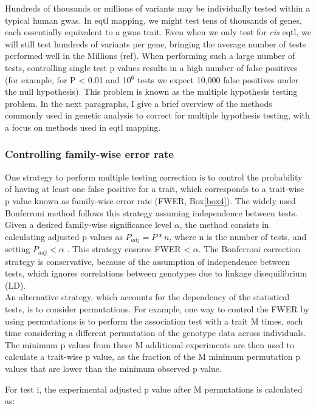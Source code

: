 Hundreds of thousands or millions of variants may be individually tested within a typical human \gls{gwas}. 
In e\gls{qtl} mapping, we might test tens of thousands of genes, each essentially equivalent to a \gls{gwas} trait. 
Even when we only test for \textit{cis} e\gls{qtl}, we will still test hundreds of variants per gene, bringing the average number of tests performed well in the Millions (ref).  
When performing such a large number of tests, controlling single test p values results in a high number of false positives (for example, for P < 0.01 and 10$^6$ tests we expect 10,000 false positives under the null hypothesis). 
This problem is known as the multiple hypothesis testing problem. 
In the next paragraphs, I give a brief overview of the methods commonly used in genetic analysis to correct for multiple hypothesis testing, with a focus on methods used in e\gls{qtl} mapping.

\subsubsection{Controlling family-wise error rate} 

One strategy to perform multiple testing correction is to control the probability of having at least one false positive for a trait, which corresponds to a trait-wise p value known as family-wise error rate (FWER, Box\ref{box4}).
The widely used Bonferroni method follows this strategy assuming independence between tests. 
Given a desired family-wise significance level $\alpha$, the method consists in calculating adjusted p values as $P_{adj} = P*n $, where n is the number of tests, and setting $P_{adj} < \alpha$ . 
This strategy ensures FWER < $\alpha$. 
The Bonferroni correction strategy is conservative, because of the assumption of independence between tests, which ignores correlations between genotypes due to linkage disequilibrium (LD).\\

An alternative strategy, which accounts for the dependency of the statistical tests, is to consider permutations. 
For example, one way to control the FWER by using permutations is to perform the association test with a trait M times, each time considering a different permutation of the genotype data across individuals.
The minimum p values from these M additional experiments are then used to calculate a trait-wise p value, as the fraction of the M minimum permutation p values that are lower than the minimum observed p value. 

For test i, the experimental adjusted p value after M permutations is calculated as:

